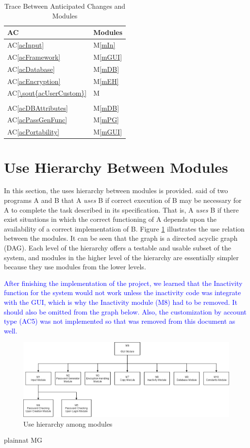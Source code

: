 \documentclass[12pt, titlepage]{article}
\newcommand{\acref}[1]{AC\ref{#1}}
\newcommand{\mref}[1]{M\ref{#1}}
\begin{document}
\begin{table}[H]
\centering
\begin{tabular}{p{} p{}}
\toprule
\textbf{AC} & \textbf{Modules}\\
\midrule
\acref{acInput} & \mref{mIn}\\
\acref{acFramework} & \mref{mGUI}\\
\acref{acDatabase} & \mref{mDB}\\
\acref{acEncryption} & \mref{mEH}\\
\acref{\sout{acUserCustom}} & \mref{\sout{mCons}\\}\\
\acref{acDBAttributes} & \mref{mDB}\\
\acref{acPassGenFunc} & \mref{mPG}\\
\acref{acPortability} & \mref{mGUI}\\
\bottomrule
\end{tabular}
\caption{Trace Between Anticipated Changes and Modules}
\label{TblACT}
\end{table}

\section{Use Hierarchy Between Modules} \label{SecUse}

In this section, the uses hierarchy between modules is
provided. \citet{Parnas1978} said of two programs A and B that A {\em uses} B if
correct execution of B may be necessary for A to complete the task described in
its specification. That is, A {\em uses} B if there exist situations in which
the correct functioning of A depends upon the availability of a correct
implementation of B.  Figure \ref{FigUH} illustrates the use relation between
the modules. It can be seen that the graph is a directed acyclic graph
(DAG). Each level of the hierarchy offers a testable and usable subset of the
system, and modules in the higher level of the hierarchy are essentially simpler
because they use modules from the lower levels. 

\textcolor{blue}{After finishing the implementation of the project, we learned that the Inactivity function for the system would not work unless the inactivity code was integrate with the GUI, which is why the Inactivity module (M8) had to be removed. It should also be omitted from the graph below. Also, the customization by account type (AC5) was not implemented so that was removed from this document as well.}

\begin{figure}[H]
\centering
\includegraphics[scale=0.5]{Images/DAG.png}
\caption{Use hierarchy among modules}
\label{FigUH}
\end{figure}

\newpage


 {plainnat}
 {MG}
\end{document}
